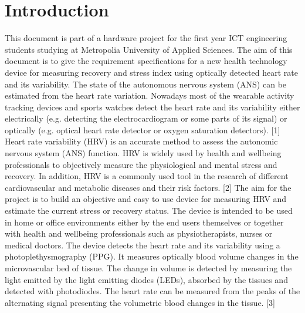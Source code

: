 \documentclass{article}
\begin{document}
\section{Introduction}
This document is part of a hardware project for the first year ICT engineering students
studying at Metropolia University of Applied Sciences. The aim of this document is to give
the requirement specifications for a new health technology device for measuring recovery
and stress index using optically detected heart rate and its variability.
The state of the autonomous nervous system (ANS) can be estimated from the heart rate
variation. Nowadays most of the wearable activity tracking devices and sports watches
detect the heart rate and its variability either electrically (e.g. detecting the electrocardiogram
or some parts of its signal) or optically (e.g. optical heart rate detector or oxygen saturation
detectors). [1]
Heart rate variability (HRV) is an accurate method to assess the autonomic nervous system
(ANS) function. HRV is widely used by health and wellbeing professionals to objectively
measure the physiological and mental stress and recovery. In addition, HRV is a commonly
used tool in the research of different cardiovascular and metabolic diseases and their risk
factors. [2]
The aim for the project is to build an objective and easy to use device for measuring HRV
and estimate the current stress or recovery status. The device is intended to be used in
home or office environments either by the end users themselves or together with health and
wellbeing professionals such as physiotherapists, nurses or medical doctors.
The device detects the heart rate and its variability using a photoplethysmography (PPG). It
measures optically blood volume changes in the microvascular bed of tissue. The change in
volume is detected by measuring the light emitted by the light emitting diodes (LEDs),
absorbed by the tissues and detected with photodiodes. The heart rate can be measured
from the peaks of the alternating signal presenting the volumetric blood changes in the
tissue. [3]

\pagebreak
\end{document}
